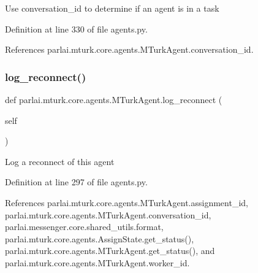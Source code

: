 \begin{DoxyVerb}Use conversation_id to determine if an agent is in a task\end{DoxyVerb}
 

Definition at line 330 of file agents.\+py.



References parlai.\+mturk.\+core.\+agents.\+M\+Turk\+Agent.\+conversation\+\_\+id.

\mbox{\label{classparlai_1_1mturk_1_1core_1_1agents_1_1MTurkAgent_a989a5ebbfea27129167087af818e4f6d}} 
\subsubsection{\texorpdfstring{log\+\_\+reconnect()}{log\_reconnect()}}
{\footnotesize\ttfamily def parlai.\+mturk.\+core.\+agents.\+M\+Turk\+Agent.\+log\+\_\+reconnect (\begin{DoxyParamCaption}\item[{}]{self }\end{DoxyParamCaption})}

\begin{DoxyVerb}Log a reconnect of this agent \end{DoxyVerb}
 

Definition at line 297 of file agents.\+py.



References parlai.\+mturk.\+core.\+agents.\+M\+Turk\+Agent.\+assignment\+\_\+id, parlai.\+mturk.\+core.\+agents.\+M\+Turk\+Agent.\+conversation\+\_\+id, parlai.\+messenger.\+core.\+shared\+\_\+utils.\+format, parlai.\+mturk.\+core.\+agents.\+Assign\+State.\+get\+\_\+status(), parlai.\+mturk.\+core.\+agents.\+M\+Turk\+Agent.\+get\+\_\+status(), and parlai.\+mturk.\+core.\+agents.\+M\+Turk\+Agent.\+worker\+\_\+id.

